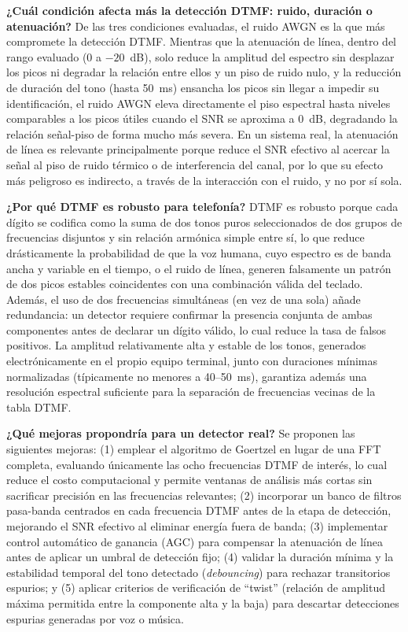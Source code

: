 \documentclass[conference]{IEEEtran}
\begin{document}
\textbf{¿Cuál condición afecta más la detección DTMF: ruido, duración o atenuación?} De las tres condiciones evaluadas, el ruido AWGN es la que más compromete la detección DTMF. Mientras que la atenuación de línea, dentro del rango evaluado (0 a $-20$~dB), solo reduce la amplitud del espectro sin desplazar los picos ni degradar la relación entre ellos y un piso de ruido nulo, y la reducción de duración del tono (hasta 50~ms) ensancha los picos sin llegar a impedir su identificación, el ruido AWGN eleva directamente el piso espectral hasta niveles comparables a los picos útiles cuando el SNR se aproxima a 0~dB, degradando la relación señal-piso de forma mucho más severa. En un sistema real, la atenuación de línea es relevante principalmente porque reduce el SNR efectivo al acercar la señal al piso de ruido térmico o de interferencia del canal, por lo que su efecto más peligroso es indirecto, a través de la interacción con el ruido, y no por sí sola.

\textbf{¿Por qué DTMF es robusto para telefonía?} DTMF es robusto porque cada dígito se codifica como la suma de dos tonos puros seleccionados de dos grupos de frecuencias disjuntos y sin relación armónica simple entre sí, lo que reduce drásticamente la probabilidad de que la voz humana, cuyo espectro es de banda ancha y variable en el tiempo, o el ruido de línea, generen falsamente un patrón de dos picos estables coincidentes con una combinación válida del teclado. Además, el uso de dos frecuencias simultáneas (en vez de una sola) añade redundancia: un detector requiere confirmar la presencia conjunta de ambas componentes antes de declarar un dígito válido, lo cual reduce la tasa de falsos positivos. La amplitud relativamente alta y estable de los tonos, generados electrónicamente en el propio equipo terminal, junto con duraciones mínimas normalizadas (típicamente no menores a 40--50~ms), garantiza además una resolución espectral suficiente para la separación de frecuencias vecinas de la tabla DTMF.

\textbf{¿Qué mejoras propondría para un detector real?} Se proponen las siguientes mejoras: (1) emplear el algoritmo de Goertzel en lugar de una FFT completa, evaluando únicamente las ocho frecuencias DTMF de interés, lo cual reduce el costo computacional y permite ventanas de análisis más cortas sin sacrificar precisión en las frecuencias relevantes; (2) incorporar un banco de filtros pasa-banda centrados en cada frecuencia DTMF antes de la etapa de detección, mejorando el SNR efectivo al eliminar energía fuera de banda; (3) implementar control automático de ganancia (AGC) para compensar la atenuación de línea antes de aplicar un umbral de detección fijo; (4) validar la duración mínima y la estabilidad temporal del tono detectado (\textit{debouncing}) para rechazar transitorios espurios; y (5) aplicar criterios de verificación de ``twist'' (relación de amplitud máxima permitida entre la componente alta y la baja) para descartar detecciones espurias generadas por voz o música.
\end{document}
